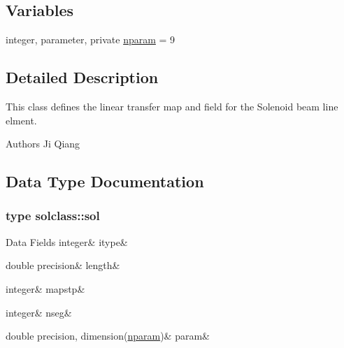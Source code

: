\subsection*{Variables}
\begin{DoxyCompactItemize}
\item 
integer, parameter, private \mbox{\hyperlink{namespacesolclass_abb5af39a08a5ff2cbe713621b2727eaf}{nparam}} = 9
\end{DoxyCompactItemize}


\subsection{Detailed Description}
This class defines the linear transfer map and field for the Solenoid beam line elment. 

\begin{DoxyAuthor}{Authors}
Ji Qiang 
\end{DoxyAuthor}


\subsection{Data Type Documentation}
\label{structsolclass_1_1sol}
\subsubsection{type solclass\+::sol}
\begin{DoxyFields}{Data Fields}
\mbox{\label{namespacesolclass_ae34e01b972a2658f3ff55fccc3f6b99a}} 
integer&
itype&
\\
\hline

\mbox{\label{namespacesolclass_a66fe4253293f305d51d6d7db753bb2c2}} 
double precision&
length&
\\
\hline

\mbox{\label{namespacesolclass_a3821a5713cb3e0e9ae5359b42644b860}} 
integer&
mapstp&
\\
\hline

\mbox{\label{namespacesolclass_a4e0b71eae9d2072fd83b1a4e524da7fc}} 
integer&
nseg&
\\
\hline

\mbox{\label{namespacesolclass_a70efaac352dbf744000a92effd3d814b}} 
double precision, dimension(\mbox{\hyperlink{namespacesolclass_abb5af39a08a5ff2cbe713621b2727eaf}{nparam}})&
param&
\\
\hline

\end{DoxyFields}


